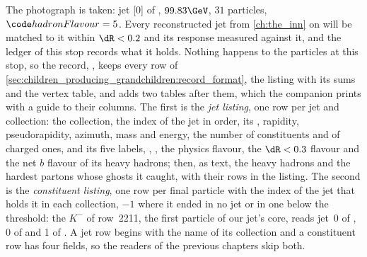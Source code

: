 The photograph is taken: jet [0] of \akfour, $99.83\GeV$, $31$ particles,
$\hadflav=5$. Every reconstructed jet from \cref{ch:the_inn} on will be
matched to it within $\dR<0.2$ and its response measured against it, and
the ledger of this stop records what it holds.
\label{sec:family_photograph:record_format}
Nothing happens to the particles at this stop, so the record,
, keeps every row of
\cref{sec:children_producing_grandchildren:record_format}, the listing
with its sums and the vertex table, and adds two tables after them, which
the companion prints with a guide to their columns. The first is the
\emph{jet listing}, one row per jet and collection: the collection, the
index of the jet in \pt order, its \pt, rapidity, pseudorapidity,
azimuth, mass and energy, the number of constituents and of charged ones,
and its five labels, \hadflav, \partflav, the physics flavour, the
$\dR<0.3$ flavour and the net $b$ flavour of its heavy hadrons; then, as
text, the heavy hadrons and the hardest partons whose ghosts it caught,
with their rows in the listing. The second is the \emph{constituent
listing}, one row per final particle with the index of the jet that
holds it in each collection, $-1$ where it ended in no jet or in one
below the threshold: the $K^-$ of row~2211, the first particle of our
jet's core, reads jet~0 of \akfour, 0 of \akfournonu and 1 of \akeight.
A jet row begins with the name of its collection and a constituent row
has four fields, so the readers of the previous chapters skip both.

